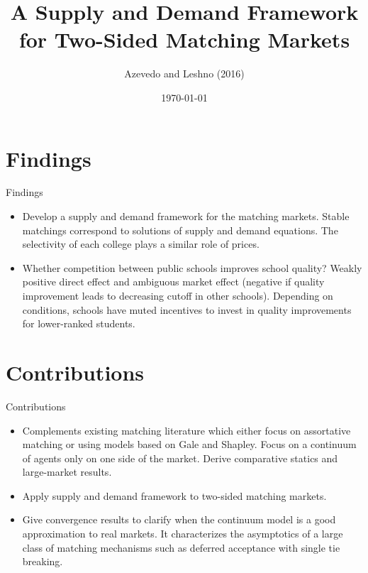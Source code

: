 \documentclass[dvipsnames,mathserif]{beamer}
\begin{document}
\rightskip\rightmargin
\title{A Supply and Demand Framework for Two-Sided Matching Markets}
\author{Azevedo and Leshno (2016)}


\footnotesize{\date{\today }


\begin{frame}
\maketitle
\end{frame}


%
\footnotesize \tableofcontents
%
\section{Findings}
\begin{frame}{Findings}
    \begin{itemize}
        \item Develop a supply and demand framework for the matching markets. Stable matchings correspond to solutions of supply and demand equations. The selectivity of each college plays a similar role of prices.\\
        \item Whether competition between public schools improves school quality? Weakly positive direct effect and ambiguous market effect (negative if quality improvement leads to decreasing cutoff in other schools). Depending on conditions, schools have muted incentives to invest in quality improvements for lower-ranked students.\\
        
    \end{itemize}
\end{frame}

\section{Contributions}
\begin{frame}{Contributions}
    \begin{itemize}
    \item Complements existing matching literature which either focus on assortative matching or using models based on Gale and Shapley. Focus on a continuum of agents only on one side of the market. Derive comparative statics and large-market results.\\
    \item Apply supply and demand framework to two-sided matching markets.\\
    \item Give convergence results to clarify when the continuum model is a good approximation to real markets. It characterizes the asymptotics of a large class of matching mechanisms such as deferred acceptance with single tie breaking.
    \end{itemize}  
\end{frame}

}
\end{document}
